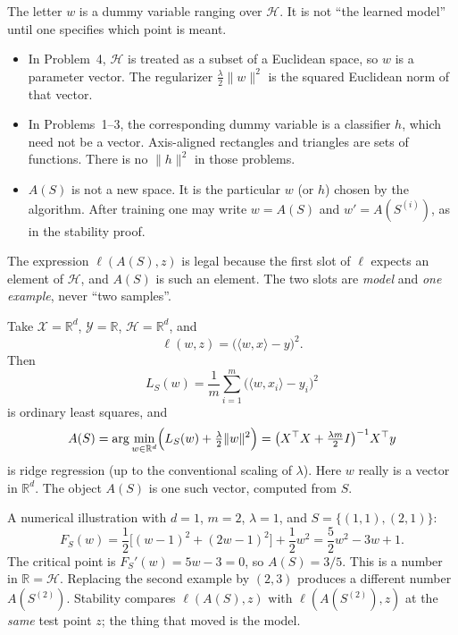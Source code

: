 \begin{remark}
\label{rem:mlu-what-is-w}
The letter $w$ is a dummy variable ranging over $\mathcal{H}$. It is not ``the learned model'' until one specifies which point is meant.
\begin{itemize}
    \item In Problem~4, $\mathcal{H}$ is treated as a subset of a Euclidean space, so $w$ is a parameter vector. The regularizer $\tfrac{\lambda}{2}\lVert w\rVert^2$ is the squared Euclidean norm of that vector.
    \item In Problems~1--3, the corresponding dummy variable is a classifier $h$, which need not be a vector. Axis-aligned rectangles and triangles are sets of functions. There is no $\lVert h\rVert^2$ in those problems.
    \item $A(S)$ is not a new space. It is the particular $w$ (or $h$) chosen by the algorithm. After training one may write $w=A(S)$ and $w'=A(S^{(i)})$, as in the stability proof.
\end{itemize}
The expression $\ell(A(S),z)$ is legal because the first slot of $\ell$ expects an element of $\mathcal{H}$, and $A(S)$ is such an element. The two slots are \emph{model} and \emph{one example}, never ``two samples''.
\end{remark}

\begin{example}
\label{exmp:mlu-ridge}
Take $\mathcal{X}=\mathbb{R}^d$, $\mathcal{Y}=\mathbb{R}$, $\mathcal{H}=\mathbb{R}^d$, and
\[
\ell(w,z)=\bigl(\langle w,x\rangle-y\bigr)^2.
\]
Then
\[
L_S(w)
=
\frac{1}{m}\sum_{i=1}^m\bigl(\langle w,x_i\rangle-y_i\bigr)^2
\]
is ordinary least squares, and
\[
A(S)
=
\arg\min_{w\in\mathbb{R}^d}
\Bigl(L_S(w)+\tfrac{\lambda}{2}\lVert w\rVert^2\Bigr)
=
\bigl(X^\top X+\tfrac{\lambda m}{2}I\bigr)^{-1}X^\top y
\]
is ridge regression (up to the conventional scaling of $\lambda$). Here $w$ really is a vector in $\mathbb{R}^d$. The object $A(S)$ is one such vector, computed from $S$.

A numerical illustration with $d=1$, $m=2$, $\lambda=1$, and $S=\{(1,1),(2,1)\}$:
\[
F_S(w)
=
\frac12\bigl[(w-1)^2+(2w-1)^2\bigr]+\frac12 w^2
=
\frac52 w^2-3w+1.
\]
The critical point is $F_S'(w)=5w-3=0$, so $A(S)=3/5$. This is a number in $\mathbb{R}=\mathcal{H}$. Replacing the second example by $(2,3)$ produces a different number $A(S^{(2)})$. Stability compares $\ell(A(S),z)$ with $\ell(A(S^{(2)}),z)$ at the \emph{same} test point $z$; the thing that moved is the model.
\end{example}

